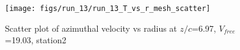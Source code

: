 \begin{figure}[H]
\centering
\texttt{[image: figs/run\_13/run\_13\_T\_vs\_r\_mesh\_scatter]}
\caption{Scatter plot of azimuthal velocity vs radius at $z/c$=6.97, $V_{free}$=19.03, station2}
\label{fig:run_13_T_vs_r_mesh_scatter}
\end{figure}


